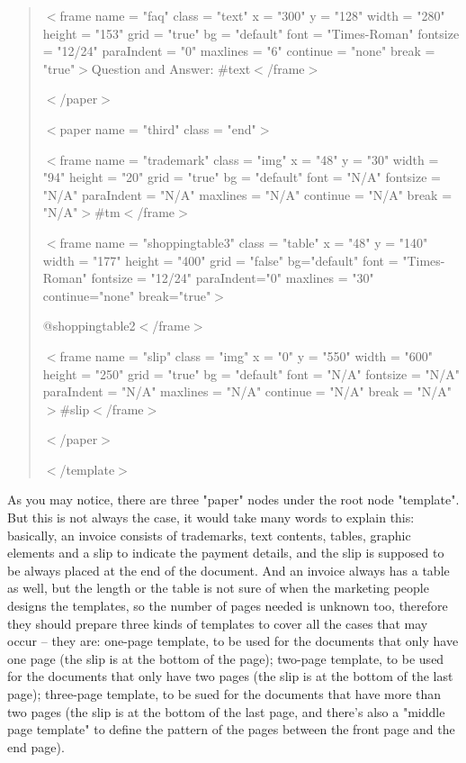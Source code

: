 \documentclass[12pt,twoside,a4paper]{report}
\begin{document}
\begin{quote}
  $<$frame name = "faq" class = "text" x = "300" y = "128" width = "280" height = "153" grid = "true" bg = "default" font = "Times-Roman" fontsize = "12/24" paraIndent = "0" maxlines = "6" continue = "none" break = "true"$>$Question and Answer: \#text$<$/frame$>$

$<$/paper$>$

$<$paper name = "third" class = "end"$>$
  
  $<$frame name = "trademark" class = "img" x = "48" y = "30" width = "94" height = "20" grid = "true" bg = "default" font = "N/A" fontsize = "N/A" paraIndent = "N/A" maxlines = "N/A" continue = "N/A" break = "N/A"$>$\#tm$<$/frame$>$

  $<$frame name = "shoppingtable3" class = "table" x = "48" y = "140" width = "177" height = "400" grid = "false" bg="default" font = "Times-Roman" fontsize = "12/24" paraIndent="0" maxlines = "30" continue="none" break="true"$>$

  @shoppingtable2$<$/frame$>$

  $<$frame name = "slip" class = "img" x = "0" y = "550" width = "600" height = "250" grid = "true" bg = "default" font = "N/A" fontsize = "N/A" paraIndent = "N/A" maxlines = "N/A" continue = "N/A" break = "N/A"$>$\#slip$<$/frame$>$

$<$/paper$>$

$<$/template$>$ 

\end{quote}

  As you may notice, there are three "paper" nodes under the root node "template". But this is not always the case, it would take many words to explain this: basically, an invoice consists of trademarks, text contents, tables, graphic elements and a slip to indicate the payment details, and the slip is supposed to be always placed at the end of the document. And an invoice always has a table as well, but the length or the table is not sure of when the marketing people designs the templates, so the number of pages needed is unknown too, therefore they should prepare three kinds of templates to cover all the cases that may occur -- they are: one-page template, to be used for the documents that only have one page (the slip is at the bottom of the page); two-page template, to be used for the documents that only have two pages (the slip is at the bottom of the last page); three-page template, to be sued for the documents that have more than two pages (the slip is at the bottom of the last page, and there's also a "middle page template" to define the pattern of the pages between the front page and the end page). 
\end{document}
